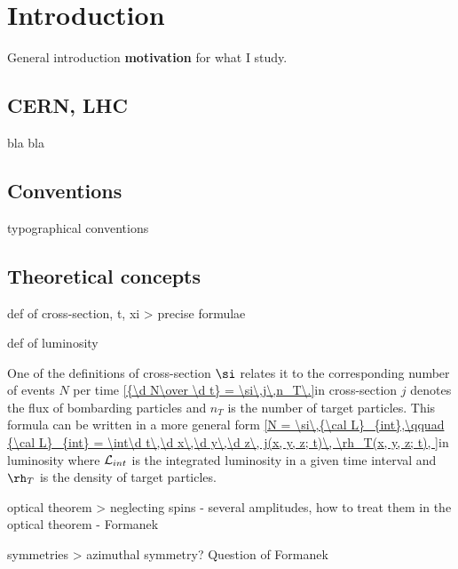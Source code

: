 \chapter{Introduction}

\> General introduction
\> {\bf motivation} for what I study.

\section{CERN, LHC}

\> bla bla


\section{Conventions}

\> typographical conventions



\section{Theoretical concepts}

\> def of cross-section, t, xi
\>> precise formulae

\> def of luminosity

One of the definitions of cross-section $\si$ relates it to the corresponding number of events $N$ per time
\eqref{{\d N\over \d t} = \si\,j\,n_T\.}{in cross-section}
$j$ denotes the flux of bombarding particles and $n_T$ is the number of target particles. This formula can be written in a more general form
\eqref{N = \si\,{\cal L}_{int},\qquad {\cal L}_{int} = \int\d t\,\d x\,\d y\,\d z\, j(x, y, z; t)\, \rh_T(x, y, z; t), }{in luminosity}
where ${\cal L}_{int}$ is the integrated luminosity in a given time interval and $\rh_T$ is the density of target particles.



\> optical theorem
\>> neglecting spins - several amplitudes, how to treat them in the optical theorem - Formanek

\> symmetries
\>> azimuthal symmetry? Question of Formanek
